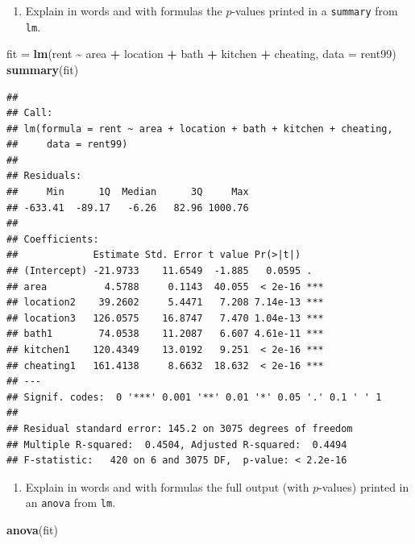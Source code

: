 \documentclass[
]{article}
\newenvironment{Shaded}{\begin{snugshade}}{\end{snugshade}}
\newcommand{\AttributeTok}[1]{\textcolor[rgb]{0.13,0.29,0.53}{#1}}
\newcommand{\FunctionTok}[1]{\textcolor[rgb]{0.13,0.29,0.53}{\textbf{#1}}}
\newcommand{\NormalTok}[1]{#1}
\newcommand{\OtherTok}[1]{\textcolor[rgb]{0.56,0.35,0.01}{#1}}
\newcommand{\SpecialCharTok}[1]{\textcolor[rgb]{0.81,0.36,0.00}{\textbf{#1}}}
\providecommand{\tightlist}{%
  \setlength{\itemsep}{0pt}\setlength{\parskip}{0pt}}
\begin{document}
\begin{enumerate}
\def\labelenumi{\arabic{enumi}.}
\setcounter{enumi}{1}
\tightlist
\item
  Explain in words and with formulas the \(p\)-values printed in a
  \texttt{summary} from \texttt{lm}.
\end{enumerate}

\begin{Shaded}
\begin{Highlighting}[]
\NormalTok{fit }\OtherTok{=} \FunctionTok{lm}\NormalTok{(rent }\SpecialCharTok{\textasciitilde{}}\NormalTok{ area }\SpecialCharTok{+}\NormalTok{ location }\SpecialCharTok{+}\NormalTok{ bath }\SpecialCharTok{+}\NormalTok{ kitchen }\SpecialCharTok{+}\NormalTok{ cheating, }\AttributeTok{data =}\NormalTok{ rent99)}
\FunctionTok{summary}\NormalTok{(fit)}
\end{Highlighting}
\end{Shaded}

\begin{verbatim}
## 
## Call:
## lm(formula = rent ~ area + location + bath + kitchen + cheating, 
##     data = rent99)
## 
## Residuals:
##     Min      1Q  Median      3Q     Max 
## -633.41  -89.17   -6.26   82.96 1000.76 
## 
## Coefficients:
##             Estimate Std. Error t value Pr(>|t|)    
## (Intercept) -21.9733    11.6549  -1.885   0.0595 .  
## area          4.5788     0.1143  40.055  < 2e-16 ***
## location2    39.2602     5.4471   7.208 7.14e-13 ***
## location3   126.0575    16.8747   7.470 1.04e-13 ***
## bath1        74.0538    11.2087   6.607 4.61e-11 ***
## kitchen1    120.4349    13.0192   9.251  < 2e-16 ***
## cheating1   161.4138     8.6632  18.632  < 2e-16 ***
## ---
## Signif. codes:  0 '***' 0.001 '**' 0.01 '*' 0.05 '.' 0.1 ' ' 1
## 
## Residual standard error: 145.2 on 3075 degrees of freedom
## Multiple R-squared:  0.4504, Adjusted R-squared:  0.4494 
## F-statistic:   420 on 6 and 3075 DF,  p-value: < 2.2e-16
\end{verbatim}

\begin{enumerate}
\def\labelenumi{\arabic{enumi}.}
\setcounter{enumi}{2}
\tightlist
\item
  Explain in words and with formulas the full output (with \(p\)-values)
  printed in an \texttt{anova} from \texttt{lm}.
\end{enumerate}

\begin{Shaded}
\begin{Highlighting}[]
\FunctionTok{anova}\NormalTok{(fit)}
\end{Highlighting}
\end{Shaded}
\end{document}
